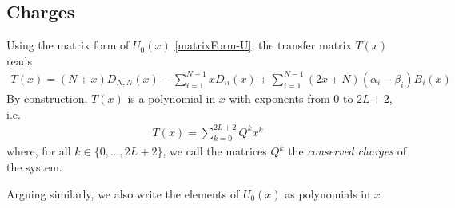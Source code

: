 \documentclass[10pt]{article}
\numberwithin{equation}{section}
\numberwithin{equation}{subsection}
\begin{document}
\subsection{Charges}
Using the matrix form of $U_{0}(x)$ \eqref{matrixForm-U}, the transfer matrix $T(x)$ reads
\begin{equation}
	\begin{split}
		T(x)=%
	(N+x)D_{N,N}(x)-\sum_{i=1}^{N-1}xD_{ii}(x)+\sum_{i=1}^{N-1}(2x+N)(\alpha_{i}-\beta_{i})B_{i}(x)
	\end{split}
\end{equation}
By construction, $T(x)$ is a polynomial in $x$ with exponents from $0$ to $2L+2$, i.e. 
\begin{equation}
	\begin{split}
		T(x)=
		\sum_{k=0}^{2L+2}Q^{k}x^{k}
	\end{split}
\end{equation}
where, for all $k\in\{0,\ldots,2L+2\}$, we call the matrices $Q^{k}$ the \textit{conserved charges} of the system. 

Arguing similarly, we also write the elements of $U_{0}(x)$ as polynomials in $x$ 
\end{document}
